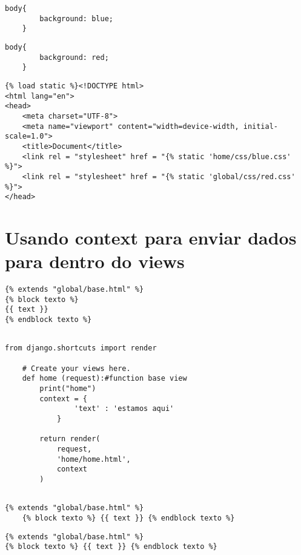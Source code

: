 \documentclass{article}
\begin{document}
\begin{lstlisting}[style=cssStyle, caption={home/css/blue.css}]
    body{
        background: blue;
    }
\end{lstlisting}

\begin{lstlisting}[style=cssStyle, caption={global/css/red.css}]
    body{
        background: red;
    }
\end{lstlisting}

\begin{lstlisting}[style=djangohtml, caption={base/global/partials/head.html}]
    {% load static %}<!DOCTYPE html>
<html lang="en">
<head>
    <meta charset="UTF-8">
    <meta name="viewport" content="width=device-width, initial-scale=1.0">
    <title>Document</title>
    <link rel = "stylesheet" href = "{% static 'home/css/blue.css' %}">
    <link rel = "stylesheet" href = "{% static 'global/css/red.css' %}">
</head>
\end{lstlisting}

\section{Usando context para enviar dados para dentro do views}
\begin{lstlisting}[style=djangohtml, caption={home/templates/home/home.html}]
{% extends "global/base.html" %}
{% block texto %} 
{{ text }}
{% endblock texto %}
   
\end{lstlisting}

\begin{lstlisting}[style=pythonStyle, caption={home/views.py}]
    from django.shortcuts import render

    # Create your views here.
    def home (request):#function base view
        print("home")
        context = {
                'text' : 'estamos aqui'
            }
    
        return render(
            request,
            'home/home.html',
            context
        )
    
\end{lstlisting}

\begin{lstlisting}[style=djangohtml, caption={blog/templates/blog/example.html}]
    {% extends "global/base.html" %}
    {% block texto %} {{ text }} {% endblock texto %}
\end{lstlisting}

\begin{lstlisting}[style=djangohtml, caption={blog/templates/blog/example.html}]
{% extends "global/base.html" %}
{% block texto %} {{ text }} {% endblock texto %}  
\end{lstlisting}
\end{document}
